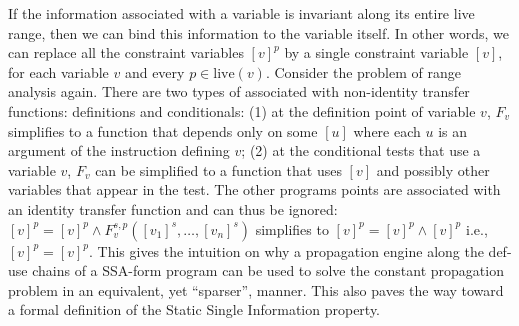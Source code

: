 If the information associated with a variable is invariant along its
entire live range, then we can bind this information to the variable itself.
In other words, we can replace all the constraint variables
$[v]^p$ by a single constraint variable $[v]$, for each variable $v$
and every $p\in \textrm{live}(v)$. 
Consider the problem of range analysis again. There are two types of \splitpoints associated with non-identity transfer functions: definitions and conditionals:
(1) at the definition point of variable $v$, $F_v$ simplifies to a function that depends only on some $[u]$ where each $u$ is an argument of the instruction defining $v$;
(2) at the conditional tests that use a variable $v$, $F_v$ can be simplified to a function that uses $[v]$ and possibly other variables that appear in the test.
The other programs points are associated with an identity transfer function and can thus be ignored:  $[v]^p =[v]^p \wedge F_v^{s,p}([v_1]^s, \dots, [v_n]^s)$ simplifies to  $[v]^p = [v]^p \wedge [v]^p$ i.e., $[v]^p = [v]^p$. 
This gives the intuition on why a propagation engine along the def-use chains of a SSA-form program can be used to solve the constant propagation problem in an equivalent, yet ``sparser'', manner.
This also paves the way toward a formal definition of the Static Single Information property.

